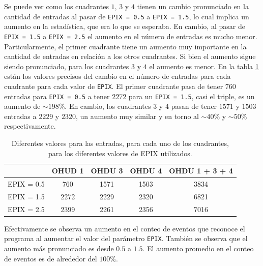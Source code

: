 Se puede ver como los cuadrantes $1$, $3$ y $4$ tienen un cambio pronunciado en la cantidad de entradas al pasar de \verb|EPIX = 0.5| a \verb|EPIX = 1.5|, lo cual implica un aumento en la estadística, que era lo que se esperaba. En cambio, al pasar de \verb|EPIX = 1.5| a \verb|EPIX = 2.5| el aumento en el número de entradas es mucho menor. Particularmente, el primer cuadrante tiene un aumento muy importante en la cantidad de entradas en relación a los otros cuadrantes. Si bien el aumento sigue siendo pronunciado, para los cuadrantes $3$ y $4$ el aumento es menor. En la tabla \ref{tab:EntriesVsEpix} están los valores precisos del cambio en el número de entradas para cada cuadrante para cada valor de \verb|EPIX|. El primer cuadrante pasa de tener $760$ entradas para \verb|EPIX = 0.5| a tener $2272$ para un \verb|EPIX = 1.5|, casi el triple, es un aumento de $\sim 198\%$. En cambio, los cuadrantes $3$ y $4$ pasan de tener $1571$ y $1503$ entradas a $2229$ y $2320$, un aumento muy similar y en torno al $\sim40\%$ y $\sim50\%$ respectivamente.
\begin{table}[h]
\centering
\begin{tabular}{@{}c|c|c|c|c@{}}
\toprule
           & OHUD 1 & OHDU 3 & OHDU 4 & OHDU 1 + 3 + 4 \\ \midrule\hline
EPIX = 0.5 & 760    & 1571   & 1503   & 3834           \\
EPIX = 1.5 & 2272   & 2229   & 2320   & 6821           \\
EPIX = 2.5 & 2399   & 2261   & 2356   & 7016           \\ \bottomrule
\end{tabular}
\caption{\footnotesize{Diferentes valores para las entradas, para cada uno de los cuadrantes, para los diferentes valores de EPIX utilizados.}}
\label{tab:EntriesVsEpix}
\end{table}
Efectivamente se observa un aumento en el conteo de eventos que reconoce el programa al aumentar el valor del parámetro \verb|EPIX|. También se observa que el aumento más pronunciado es desde $0.5$ a $1.5$. El aumento promedio en el conteo de eventos es de alrededor del $100\%$.
